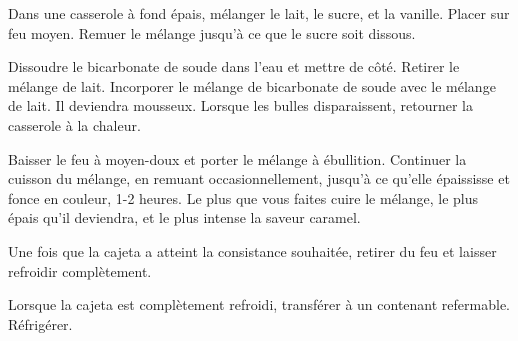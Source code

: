 \begin{steps}
    \item[] 
    \item Dans une casserole à fond épais, mélanger le lait, le sucre, et la vanille. Placer sur feu moyen. Remuer le mélange jusqu'à ce que le sucre soit dissous.
    \item Dissoudre le bicarbonate de soude dans l'eau et mettre de côté. Retirer le mélange de lait. Incorporer le mélange de bicarbonate de soude avec le mélange de lait. Il deviendra mousseux. Lorsque les bulles disparaissent, retourner la casserole à la chaleur.
    \item Baisser le feu à moyen-doux et porter le mélange à ébullition. Continuer la cuisson du mélange, en remuant occasionnellement, jusqu'à ce qu'elle épaississe et fonce en couleur, 1-2 heures. Le plus que vous faites cuire le mélange, le plus épais qu'il deviendra, et le plus intense la saveur caramel.
    \item Une fois que la cajeta a atteint la consistance souhaitée, retirer du feu et laisser refroidir complètement.
    \item Lorsque la cajeta est complètement refroidi, transférer à un contenant refermable. Réfrigérer.
\end{steps}
